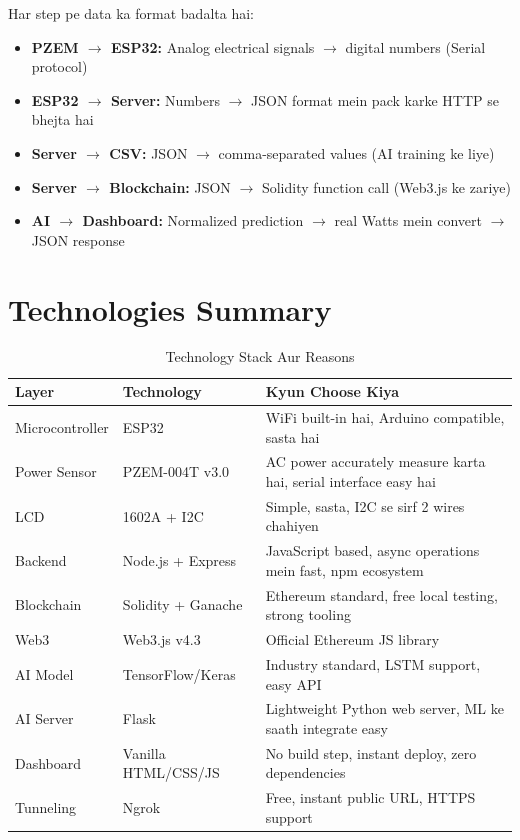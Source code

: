 Har step pe data ka format badalta hai:
\begin{itemize}[nosep]
    \item \textbf{PZEM $\rightarrow$ ESP32:} Analog electrical signals $\rightarrow$ digital numbers (Serial protocol)
    \item \textbf{ESP32 $\rightarrow$ Server:} Numbers $\rightarrow$ JSON format mein pack karke HTTP se bhejta hai
    \item \textbf{Server $\rightarrow$ CSV:} JSON $\rightarrow$ comma-separated values (AI training ke liye)
    \item \textbf{Server $\rightarrow$ Blockchain:} JSON $\rightarrow$ Solidity function call (Web3.js ke zariye)
    \item \textbf{AI $\rightarrow$ Dashboard:} Normalized prediction $\rightarrow$ real Watts mein convert $\rightarrow$ JSON response
\end{itemize}

\section{Technologies Summary}

\begin{table}[H]
\centering
\begin{tabularx}{\textwidth}{l l X}
\toprule
\textbf{Layer} & \textbf{Technology} & \textbf{Kyun Choose Kiya} \\
\midrule
Microcontroller & ESP32 & WiFi built-in hai, Arduino compatible, sasta hai \\
Power Sensor & PZEM-004T v3.0 & AC power accurately measure karta hai, serial interface easy hai \\
LCD & 1602A + I2C & Simple, sasta, I2C se sirf 2 wires chahiyen \\
Backend & Node.js + Express & JavaScript based, async operations mein fast, npm ecosystem \\
Blockchain & Solidity + Ganache & Ethereum standard, free local testing, strong tooling \\
Web3 & Web3.js v4.3 & Official Ethereum JS library \\
AI Model & TensorFlow/Keras & Industry standard, LSTM support, easy API \\
AI Server & Flask & Lightweight Python web server, ML ke saath integrate easy \\
Dashboard & Vanilla HTML/CSS/JS & No build step, instant deploy, zero dependencies \\
Tunneling & Ngrok & Free, instant public URL, HTTPS support \\
\bottomrule
\end{tabularx}
\caption{Technology Stack Aur Reasons}
\end{table}

